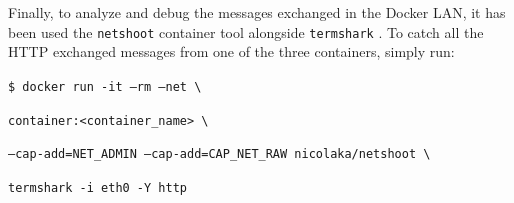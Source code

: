 Finally, to analyze and debug the messages exchanged in the Docker LAN, it has been used the \texttt{netshoot} \cite{netsh} container tool alongside \texttt{termshark} \cite{terms}. To catch all the HTTP exchanged messages from one of the three containers, simply run:

  \texttt{\$ docker run -it --rm --net \textbackslash}
  
  \hspace{0.8cm} \texttt{container:<container\_name> \textbackslash} 
      
  \hspace{0.8cm} \texttt{--cap-add=NET\_ADMIN --cap-add=CAP\_NET\_RAW nicolaka/netshoot \textbackslash}

  \hspace{0.8cm} \texttt{termshark -i eth0 -Y http}



